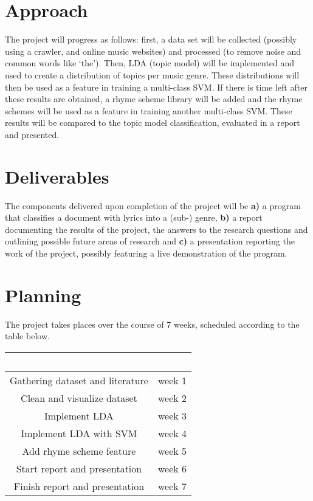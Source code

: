 \documentclass[12pt,a4paper]{amsart}
\begin{document}
\section{Approach}
The project will progress as follows: first, a data set will be collected (possibly using a crawler, and online music websites) and processed (to remove noise and common words like `the'). Then, LDA (topic model) will be implemented and used to create a distribution of topics per music genre. These distributions will then be used as a feature in training a multi-class SVM. If there is time left after these results are obtained, a rhyme scheme library will be added and the rhyme schemes will be used as a feature in training another multi-class SVM. These results will be compared to the topic model classification, evaluated in a report and presented.

\section{Deliverables}
The components delivered upon completion of the project will be \textbf{a)} a program that classifies a document with lyrics into a (sub-) genre, \textbf{b)} a report documenting the results of the project, the answers to the research questions and outlining possible future areas of research and \textbf{c)} a presentation reporting the work of the project, possibly featuring a live demonstration of the program.
\section{Planning}
The project takes places over the course of 7 weeks, scheduled according to the table below.
\begin{center}
\begin{tabular}{ |c | c |}
\rowcolor{dark-gray}
\hline
\textcolor{white}{\textbf{Subject}} & \textcolor{white}{\textbf{Week}}\\
	\hline
	Gathering dataset and literature & week 1  \\
	\hline
	Clean and visualize dataset & week 2 \\
	\hline
	Implement LDA & week 3 \\
	\hline
	Implement LDA with SVM & week 4 \\
	\hline
	Add rhyme scheme feature & week 5 \\
	\hline
	Start report and presentation & week 6 \\
	\hline
	Finish report and presentation & week 7\\
	\hline
\end{tabular}\\
\end{center}


\end{document}

